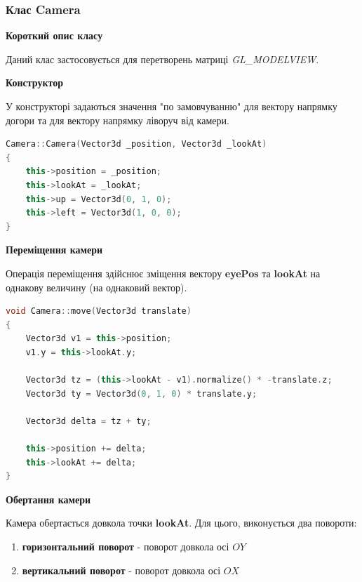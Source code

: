 \documentclass[simple,a4paper,14pt,ukrainian,utf8]{eskdtext}
\begin{document}
        \subsubsection{Клас Camera}
        
        \textbf{Короткий опис класу}
        
        Даний клас застосовується для перетворень матриці \textit{GL\_MODELVIEW}.
        
        \textbf{Конструктор}
        
        У конструкторі задаються значення "по замовчуванню" для вектору напрямку догори та для вектору напрямку ліворуч від камери.
        
\begin{small}
\begin{lstlisting}[language=C++]
Camera::Camera(Vector3d _position, Vector3d _lookAt)
{
    this->position = _position;
    this->lookAt = _lookAt;
    this->up = Vector3d(0, 1, 0);
    this->left = Vector3d(1, 0, 0);
}
\end{lstlisting}
\end{small}
        
        \textbf{Переміщення камери}
        
        Операція переміщення здійснює зміщення вектору \textbf{eyePos} та \textbf{lookAt} на однакову величину (на однаковий вектор).
        
\begin{small}
\begin{lstlisting}[language=C++]
void Camera::move(Vector3d translate)
{
    Vector3d v1 = this->position;
    v1.y = this->lookAt.y;

    Vector3d tz = (this->lookAt - v1).normalize() * -translate.z;
    Vector3d ty = Vector3d(0, 1, 0) * translate.y;

    Vector3d delta = tz + ty;

    this->position += delta;
    this->lookAt += delta;
}
\end{lstlisting}
\end{small}
        
        \textbf{Обертання камери}
        
        Камера обертається довкола точки \textbf{lookAt}. Для цього, виконується два повороти:
	
		\begin{enumerate}
			\item \textbf{горизонтальний поворот} - поворот довкола осі $OY$
			\item \textbf{вертикальний поворот} - поворот довкола осі $OX$
		\end{enumerate}
        
\end{document}
